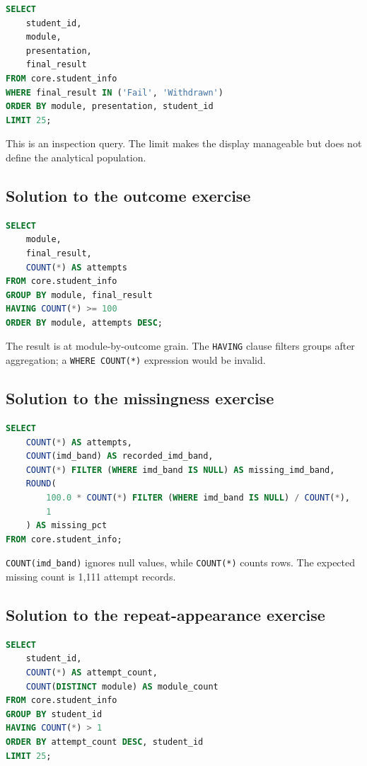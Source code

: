 \begin{lstlisting}[language=SQL]
SELECT
    student_id,
    module,
    presentation,
    final_result
FROM core.student_info
WHERE final_result IN ('Fail', 'Withdrawn')
ORDER BY module, presentation, student_id
LIMIT 25;
\end{lstlisting}

This is an inspection query. The limit makes the display manageable but does
not define the analytical population.

\subsection{Solution to the outcome exercise}
\label{sol:sql-outcomes}

\begin{lstlisting}[language=SQL]
SELECT
    module,
    final_result,
    COUNT(*) AS attempts
FROM core.student_info
GROUP BY module, final_result
HAVING COUNT(*) >= 100
ORDER BY module, attempts DESC;
\end{lstlisting}

The result is at module-by-outcome grain. The \texttt{HAVING} clause filters
groups after aggregation; a \texttt{WHERE COUNT(*)} expression would be
invalid.

\subsection{Solution to the missingness exercise}
\label{sol:sql-missing}

\begin{lstlisting}[language=SQL]
SELECT
    COUNT(*) AS attempts,
    COUNT(imd_band) AS recorded_imd_band,
    COUNT(*) FILTER (WHERE imd_band IS NULL) AS missing_imd_band,
    ROUND(
        100.0 * COUNT(*) FILTER (WHERE imd_band IS NULL) / COUNT(*),
        1
    ) AS missing_pct
FROM core.student_info;
\end{lstlisting}

\texttt{COUNT(imd\_band)} ignores null values, while \texttt{COUNT(*)} counts
rows. The expected missing count is 1,111 attempt records.

\subsection{Solution to the repeat-appearance exercise}
\label{sol:sql-repeats}

\begin{lstlisting}[language=SQL]
SELECT
    student_id,
    COUNT(*) AS attempt_count,
    COUNT(DISTINCT module) AS module_count
FROM core.student_info
GROUP BY student_id
HAVING COUNT(*) > 1
ORDER BY attempt_count DESC, student_id
LIMIT 25;
\end{lstlisting}

